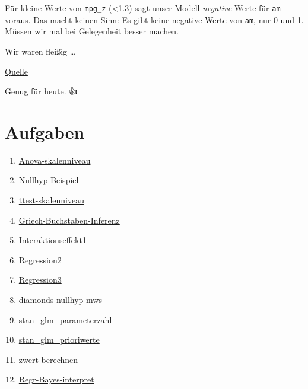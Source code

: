\documentclass[
  a4paper,
  DIV=11]{scrreprt}
\providecommand{\tightlist}{%
  \setlength{\itemsep}{0pt}\setlength{\parskip}{0pt}}\usepackage{longtable,booktabs,array}
\theoremstyle{definition}
\theoremstyle{remark}
\begin{document}
Für kleine Werte von \texttt{mpg\_z} (\textless1.3) sagt unser Modell
\emph{negative} Werte für \texttt{am} voraus. Das macht keinen Sinn: Es
gibt keine negative Werte von \texttt{am}, nur 0 und 1. Müssen wir mal
bei Gelegenheit besser machen.

Wir waren fleißig \ldots{}

\href{https://giphy.com/gifs/XIqCQx02E1U9W}{Quelle}

Genug für heute. 👍

\hypertarget{aufgaben-8}{%
\section{Aufgaben}\label{aufgaben-8}}

\begin{enumerate}
\def\labelenumi{\arabic{enumi}.}
\tightlist
\item
  \href{https://datenwerk.netlify.app/posts/anova-skalenniveau/anova-skalenniveau.html}{Anova-skalenniveau}
\item
  \href{https://datenwerk.netlify.app/posts/nullhyp-beispiel/nullhyp-beispiel}{Nullhyp-Beispiel}
\item
  \href{https://datenwerk.netlify.app/posts/ttest-skalenniveau/ttest-skalenniveau.html}{ttest-skalenniveau}
\item
  \href{https://datenwerk.netlify.app/posts/griech-buchstaben-inferenz/griech-buchstaben-inferenz}{Griech-Buchstaben-Inferenz}
\item
  \href{https://datenwerk.netlify.app/posts/interaktionseffekt1/interaktionseffekt1}{Interaktionseffekt1}
\item
  \href{https://datenwerk.netlify.app/posts/regression2/regression2}{Regression2}
\item
  \href{https://datenwerk.netlify.app/posts/regression3/regression3}{Regression3}
\item
  \href{https://datenwerk.netlify.app/posts/diamonds-nullhyp-mws/diamonds-nullhyp-mws.html}{diamonds-nullhyp-mws}
\item
  \href{https://datenwerk.netlify.app/posts/stan_glm_parameterzahl/stan_glm_parameterzahl.html}{stan\_glm\_parameterzahl}
\item
  \href{https://datenwerk.netlify.app/posts/stan_glm_prioriwerte/stan_glm_prioriwerte.html}{stan\_glm\_prioriwerte}
\item
  \href{https://datenwerk.netlify.app/posts/zwert-berechnen/zwert-berechnen.html}{zwert-berechnen}
\item
  \href{https://datenwerk.netlify.app/posts/regr-bayes-interpret/regr-bayes-interpret}{Regr-Bayes-interpret}

\end{enumerate}
\end{document}
